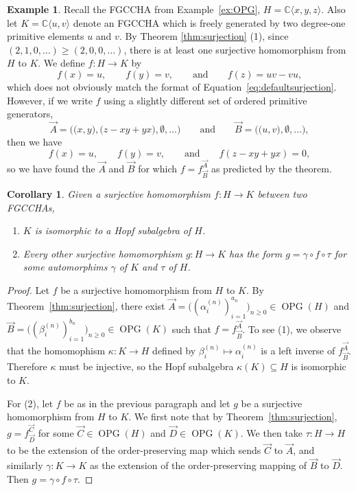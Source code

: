 \documentclass[11pt]{amsart}
\newtheorem{corollary}[theorem]{Corollary}
\theoremstyle{definition}
\newtheorem{example}[theorem]{Example}
\numberwithin{equation}{section}
\def\CC{{\mathbb C}}
\newcommand{\FGCCHA}{\textsf{FGCCHA}\xspace}
\newcommand{\FGCCHAs}{\textsf{FGCCHA}s\xspace}
\newcommand{\OPG}{\operatorname{OPG}}
\begin{document}
\begin{example}
\label{ex:quotientHopf}
Recall the \FGCCHA from Example~\ref{ex:OPG}, $H = \CC\langle x, y, z \rangle$.
Also let $K = \CC\langle u, v \rangle$ denote an \FGCCHA
which is freely generated by two degree-one primitive elements $u$ and $v$. 
By Theorem \ref{thm:surjection} (1), since $(2,1,0,\ldots) \geq (2,0,0,\ldots)$,
there is at least one surjective homomorphism from $H$ to $K$.  
We define $f: H \to K$ by
\[
f(x) = u,
\qquad
f(y) = v,
\qquad\text{and}\qquad
f(z) = uv-vu,
\]
which does not obviously match the format of Equation~\eqref{eq:defaultsurjection}.  However, if we write $f$ using a slightly different set of ordered primitive generators,
\[
\vec{A} = \Big(\big( x, y\big), \big( z - xy + yx \big), \emptyset, \ldots \Big)
\qquad
\text{and}
\qquad
\vec{B} =  \Big(\big( u, v\big), \emptyset, \ldots \Big),
\]
then we have 
\[
f(x) = u,
\qquad
f(y) = v,
\qquad\text{and}\qquad
f(z - xy + yx) = 0,
\]
so we have found the $\vec{A}$ and $\vec{B}$ for which $f = f^{\vec{A}}_{\vec{B}}$ as predicted by the theorem.
\end{example}

\begin{corollary}
Given a surjective homomorphism $f: H \to K$ between two \FGCCHAs,
\begin{enumerate}
\item $K$ is isomorphic to a Hopf subalgebra of $H$.

\item Every other surjective homomorphism $g: H \to K$ has the form
$g = \gamma \circ f \circ \tau$ for some automorphims $\gamma$ of $K$ and $\tau$ of $H$.

\end{enumerate}
\end{corollary}
\begin{proof}
Let $f$ be a surjective homomorphism from $H$ to $K$.  
By Theorem~\ref{thm:surjection}, there exist $\vec{A}  = \big( ( \alpha_{i}^{(n)})_{i = 1}^{a_{n}} \big)_{n \ge 0} \in \OPG(H)$ and $\vec{B}   = \big( ( \beta_{i}^{(n)})_{i = 1}^{b_{n}} \big)_{n \ge 0}  \in \OPG(K)$ such that $f = f^{\vec{A}}_{\vec{B}}$.  To see (1), we observe that the homomophism $\kappa: K \to H$ defined by $\beta^{(n)}_{i} \mapsto \alpha^{(n)}_{i}$ is a left inverse of $f^{\vec{A}}_{\vec{B}}$.  Therefore $\kappa$ must be injective, so the Hopf subalgebra $\kappa(K) \subseteq H$ is isomorphic to $K$.

For (2), let $f$ be as in the previous paragraph  and let $g$ be a surjective homomorphism from $H$ to $K$.  
We first note that by Theorem~\ref{thm:surjection},  $g = f^{\vec{C}}_{\vec{D}}$ for some $\vec{C} \in \OPG(H)$ and $\vec{D} \in \OPG(K)$.  We then take $\tau: H \to H$ to be the extension of the order-preserving map which sends $\vec{C}$ to $\vec{A}$, and similarly $\gamma: K \to K$ as the extension of the order-preserving mapping of $\vec{B}$ to $\vec{D}$.  Then $g = \gamma \circ f \circ \tau$.
\end{proof}
\end{document}

